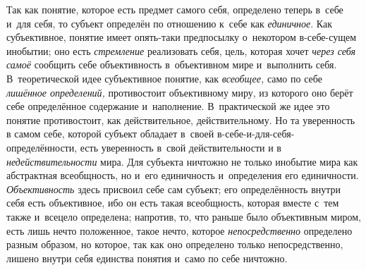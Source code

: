 Так как понятие, которое есть предмет самого себя, определено
теперь в~себе и~для себя, то субъект определён по отношению к~себе как
{\em единичное}. Как
субъективное, понятие имеет опять-таки предпосылку о~некотором в-себе-сущем
инобытии; оно есть {\em стремление}
реализовать себя, цель, которая хочет
{\em через себя самоё}
сообщить себе объективность в~объективном мире и~выполнить
себя. В~теоретической идее субъективное понятие, как
{\em всеобщее,} само по
себе {\em лишённое определений,}
противостоит объективному миру, из которого оно берёт себе
определённое содержание и~наполнение. В~практической же идее это понятие
противостоит, как действительное, действительному. Но та уверенность в
самом себе, которой субъект обладает в~своей
в-себе-и-для-себя-определённости, есть уверенность в~свой действительности
и в {\em недействительности}
мира. Для субъекта ничтожно не только инобытие мира как
абстрактная всеобщность, но и~его единичность и~определения его
единичности. {\em Объективность}
здесь присвоил себе сам субъект; его определённость внутри
себя есть объективное, ибо он есть такая всеобщность, которая вместе с~тем
также и~всецело определена; напротив, то, что раньше было объективным
миром, есть лишь нечто положенное, такое нечто, которое
{\em непосредственно}
определено разным образом, но которое, так как оно определено
только непосредственно, лишено внутри себя единства понятия и~само по себе
ничтожно.

